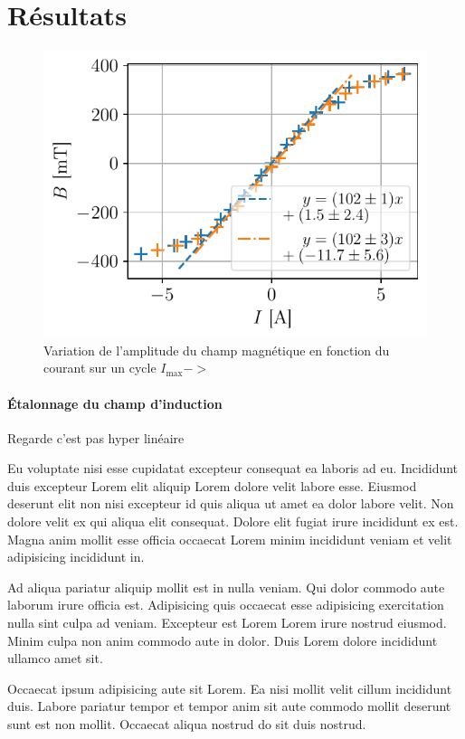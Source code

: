 \section{Résultats}

\begin{minipage}{\textwidth}
    \begin{figure}
        \includegraphics[width=\linewidth]{figures/calibration.pdf}
        \caption{Variation de l'amplitude du champ magnétique en fonction du courant sur un cycle \(I_\textrm{max} -> \)}
    \end{figure}

    \paragraph*{Étalonnage du champ d'induction}
    Regarde c'est pas hyper linéaire

    Eu voluptate nisi esse cupidatat excepteur consequat ea laboris ad eu. Incididunt duis excepteur Lorem elit aliquip Lorem dolore velit labore esse. Eiusmod deserunt elit non nisi excepteur id quis aliqua ut amet ea dolor labore velit. Non dolore velit ex qui aliqua elit consequat. Dolore elit fugiat irure incididunt ex est. Magna anim mollit esse officia occaecat Lorem minim incididunt veniam et velit adipisicing incididunt in.

    Ad aliqua pariatur aliquip mollit est in nulla veniam. Qui dolor commodo aute laborum irure officia est. Adipisicing quis occaecat esse adipisicing exercitation nulla sint culpa ad veniam. Excepteur est Lorem Lorem irure nostrud eiusmod. Minim culpa non anim commodo aute in dolor. Duis Lorem dolore incididunt ullamco amet sit.

    Occaecat ipsum adipisicing aute sit Lorem. Ea nisi mollit velit cillum incididunt duis. Labore pariatur tempor et tempor anim sit aute commodo mollit deserunt sunt est non mollit. Occaecat aliqua nostrud do sit duis nostrud.
\end{minipage}

